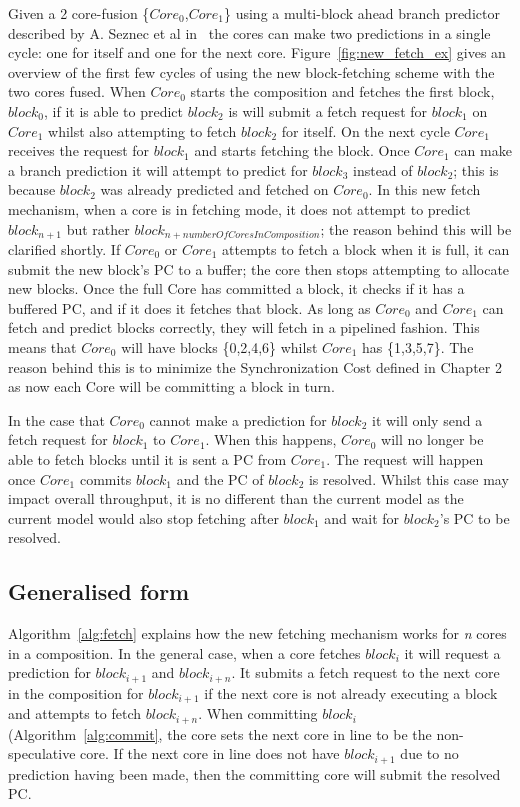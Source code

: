 Given a 2 core-fusion \{$Core_0$,$Core_1$\} using a multi-block ahead branch predictor described by A. Seznec et al in~\cite{SeseznecMultipleBlock} the cores can make two predictions in a single cycle: one for itself and one for the next core.
Figure~\ref{fig:new_fetch_ex} gives an overview of the first few cycles of using the new block-fetching scheme with the two cores fused.
When $Core_0$ starts the composition and fetches the first block, $block_0$, if it is able to predict $block_2$ is will submit a fetch request for $block_1$ on $Core_1$ whilst also attempting to fetch $block_2$ for itself.
On the next cycle $Core_1$ receives the request for $block_1$ and starts fetching the block.
Once $Core_1$ can make a branch prediction it will attempt to predict for $block_3$ instead of $block_2$; this is because $block_2$ was already predicted and fetched on $Core_0$.
In this new fetch mechanism, when a core is in fetching mode, it does not attempt to predict $block_{n+1}$ but rather $block_{n+numberOfCoresInComposition}$; the reason behind this will be clarified shortly.
If $Core_0$ or $Core_1$ attempts to fetch a block when it is full, it can submit the new block's PC to a buffer; the core then stops attempting to allocate new blocks.
Once the full Core has committed a block, it checks if it has a buffered PC, and if it does it fetches that block.
As long as $Core_0$ and $Core_1$ can fetch and predict blocks correctly, they will fetch in a pipelined fashion.
This means that $Core_0$ will have blocks \{0,2,4,6\} whilst $Core_1$ has \{1,3,5,7\}.
The reason behind this is to minimize the Synchronization Cost defined in Chapter 2 as now each Core will be committing a block in turn.

In the case that $Core_0$ cannot make a prediction for $block_2$ it will only send a fetch request for $block_1$ to $Core_1$.
When this happens, $Core_0$ will no longer be able to fetch blocks until it is sent a PC from $Core_1$.
The request will happen once $Core_1$ commits $block_1$ and the PC of $block_2$ is resolved.
Whilst this case may impact overall throughput, it is no different than the current model as the current model would also stop fetching after $block_1$ and wait for $block_2$'s PC to be resolved.

\subsection{Generalised form}

Algorithm~\ref{alg:fetch} explains how the new fetching mechanism works for \textit{n} cores in a composition.
In the general case, when a core fetches $block_i$ it will request a prediction for $block_{i+1}$ and $block_{i+n}$.
It submits a fetch request to the next core in the composition for $block_{i+1}$ if the next core is not already executing a block and attempts to fetch $block_{i+n}$.
When committing $block_i$ (Algorithm~\ref{alg:commit}, the core sets the next core in line to be the non-speculative core.
If the next core in line does not have $block_{i+1}$ due to no prediction having been made, then the committing core will submit the resolved PC.

